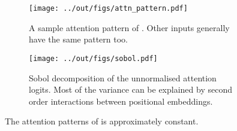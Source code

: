 \begin{figure}[t]
    \centering
    \begin{subfigure}[t]{0.55\textwidth}
        \texttt{[image: ../out/figs/attn\_pattern.pdf]}
        \caption{A sample attention pattern of \ttgpt. Other inputs generally have the same pattern too.}
        \label{fig:attn-pattern}
    \end{subfigure}%
    \hfill
    \begin{subfigure}[t]{0.42\textwidth}
        \texttt{[image: ../out/figs/sobol.pdf]}
        \caption{Sobol decomposition of the unnormalised attention logits. Most of the variance can be explained by second order interactions between positional embeddings.}
        \label{fig:attn-sobol}
    \end{subfigure}
    \caption{The attention patterns of \ttgpt is approximately constant.}
    \label{fig:attn}
\end{figure}